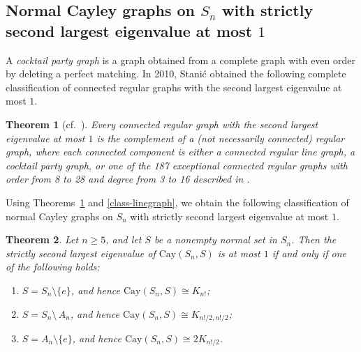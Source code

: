 \documentclass[12pt, a4paper]{article}
\newtheorem{thm}{Theorem}[section]
\theoremstyle{definition}
\begin{document}
\subsection{Normal Cayley graphs on $S_n$ with strictly second largest eigenvalue at most $1$}

A \emph{cocktail party graph} is a graph obtained from a complete graph with even order by deleting a perfect matching. In 2010, Stani\'{c} \cite{Stanic2010} obtained the following complete classification of connected regular graphs with the second largest eigenvalue at most $1$.  


\begin{thm}[cf.~{\cite[Theorem 3.1]{Stanic2010}}]\label{second-ev-1}
	Every connected regular graph with the second largest eigenvalue at most $1$ is the complement of a (not necessarily connected) regular graph, where each connected component is either a connected regular line graph, a cocktail party graph, or one of the 187 exceptional connected regular graphs with order from 8 to 28 and degree from 3 to 16 described in \cite[pp.\,213--227]{CRS2004}.
\end{thm}

Using Theorems~\ref{second-ev-1} and \ref{class-linegraph}, we obtain the following classification of normal Cayley graphs on $S_n$ with strictly second largest eigenvalue at most $1$.

\begin{thm}\label{sn-cay-sec-1}
	Let $n\ge 5$, and let $S$ be a nonempty normal set in $S_n$. Then the strictly second largest eigenvalue of $\mathrm{Cay}(S_n,S)$ is at most $1$ if and only if one of the following holds:
	\begin{enumerate}[\rm (a)]
		\item $S=S_n\setminus\{e\}$, and hence $\mathrm{Cay}(S_n,S)\cong K_{n!}$;
		\item $S=S_n\setminus \, A_n$, and hence $\mathrm{Cay}(S_n,S)\cong K_{n!/2,n!/2}$;
		\item $S=A_n\setminus\{e\}$, and hence $\mathrm{Cay}(S_n,S)\cong 2K_{n!/2}$.
	\end{enumerate}
\end{thm}
\end{document}
